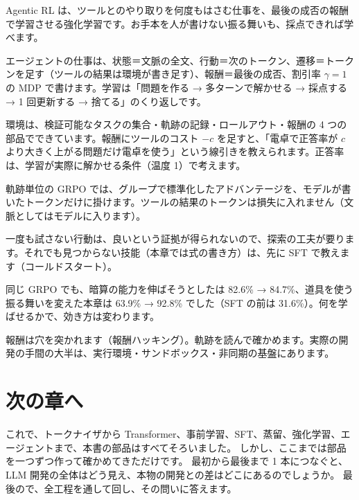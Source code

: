 \begin{summary}
\item Agentic RL は、ツールとのやり取りを何度もはさむ仕事を、最後の成否の報酬で学習させる強化学習です。お手本を人が書けない振る舞いも、採点できれば学べます。
\item エージェントの仕事は、状態＝文脈の全文、行動＝次のトークン、遷移＝トークンを足す（ツールの結果は環境が書き足す）、報酬＝最後の成否、割引率 $\gamma=1$ の MDP で書けます。学習は「問題を作る → 多ターンで解かせる → 採点する → 1 回更新する → 捨てる」のくり返しです。
\item 環境は、検証可能なタスクの集合・軌跡の記録・ロールアウト・報酬の 4 つの部品でできています。報酬にツールのコスト $-c$ を足すと、「電卓で正答率が $c$ より大きく上がる問題だけ電卓を使う」という線引きを教えられます。正答率は、学習が実際に解かせる条件（温度 1）で考えます。
\item 軌跡単位の GRPO では、グループで標準化したアドバンテージを、モデルが書いたトークンだけに掛けます。ツールの結果のトークンは損失に入れません（文脈としてはモデルに入ります）。
\item 一度も試さない行動は、良いという証拠が得られないので、探索の工夫が要ります。それでも見つからない技能（本章では式の書き方）は、先に SFT で教えます（コールドスタート）。
\item 同じ GRPO でも、暗算の能力を伸ばそうとしたは 82.6\% → 84.7\%、道具を使う振る舞いを変えた本章は 63.9\% → 92.8\% でした（SFT の前は 31.6\%）。何を学ばせるかで、効き方は変わります。
\item 報酬は穴を突かれます（報酬ハッキング）。軌跡を読んで確かめます。実際の開発の手間の大半は、実行環境・サンドボックス・非同期の基盤にあります。
\end{summary}

\section*{次の章へ}
これで、トークナイザから Transformer、事前学習、SFT、蒸留、強化学習、エージェントまで、本書の部品はすべてそろいました。
しかし、ここまでは部品を一つずつ作って確かめてきただけです。
最初から最後まで 1 本につなぐと、LLM 開発の全体はどう見え、本物の開発との差はどこにあるのでしょうか。
最後ので、全工程を通して回し、その問いに答えます。


